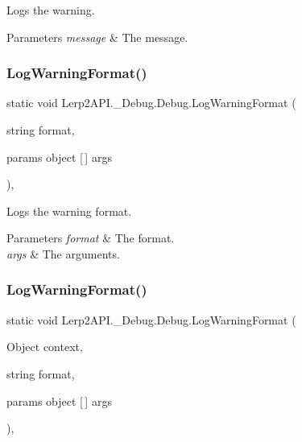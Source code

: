 Logs the warning. 


\begin{DoxyParams}{Parameters}
{\em message} & The message.\\
\hline
\end{DoxyParams}
\mbox{\label{class_lerp2_a_p_i_1_1___debug_1_1_debug_a32f7d39f79f3d6172fa0386392a8608c}} 
\subsubsection{\texorpdfstring{Log\+Warning\+Format()}{LogWarningFormat()}\hspace{0.1cm}{\footnotesize\ttfamily [1/2]}}
{\footnotesize\ttfamily static void Lerp2\+A\+P\+I.\+\_\+\+Debug.\+Debug.\+Log\+Warning\+Format (\begin{DoxyParamCaption}\item[{string}]{format,  }\item[{params object \mbox{[}$\,$\mbox{]}}]{args }\end{DoxyParamCaption})\hspace{0.3cm}{\ttfamily [inline]}, {\ttfamily [static]}}



Logs the warning format. 


\begin{DoxyParams}{Parameters}
{\em format} & The format.\\
\hline
{\em args} & The arguments.\\
\hline
\end{DoxyParams}
\mbox{\label{class_lerp2_a_p_i_1_1___debug_1_1_debug_ad50ef0f21af33bbe2b11b2ac6fd2be32}} 
\subsubsection{\texorpdfstring{Log\+Warning\+Format()}{LogWarningFormat()}\hspace{0.1cm}{\footnotesize\ttfamily [2/2]}}
{\footnotesize\ttfamily static void Lerp2\+A\+P\+I.\+\_\+\+Debug.\+Debug.\+Log\+Warning\+Format (\begin{DoxyParamCaption}\item[{Object}]{context,  }\item[{string}]{format,  }\item[{params object \mbox{[}$\,$\mbox{]}}]{args }\end{DoxyParamCaption})\hspace{0.3cm}{\ttfamily [inline]}, {\ttfamily [static]}}



